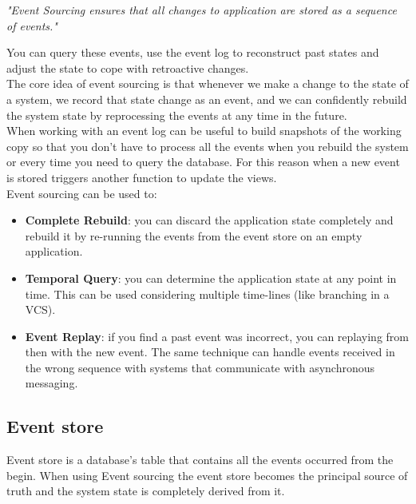\newpage
{}
\begin{center}
	\emph{"Event Sourcing ensures that all changes to application are stored as a sequence of events."} \\
\end{center}

You can query these events, use the event log to reconstruct past states and adjust the state to cope with retroactive changes.\\
The core idea of event sourcing is that whenever we make a change to the state of a system, we record that state change as an event, and we can confidently rebuild the system state by reprocessing the events at any time in the future.\\
When working with an event log can be useful to build snapshots of the working copy so that you don't have to process all the events when you rebuild the system or every time you need to query the database. For this reason when a new event is stored triggers another function to update the views.\\
Event sourcing can be used to:
\begin{itemize}
	\item \textbf{Complete Rebuild}: you can discard the application state completely and rebuild it by re-running the events from the event store on an empty application.
	\item \textbf{Temporal Query}: you can determine the application state at any point in time. This can be used considering multiple time-lines (like branching in a VCS).
	\item \textbf{Event Replay}: if you find a past event was incorrect, you can replaying from then with the new event. The same technique can handle events received in the wrong sequence with systems that communicate with asynchronous messaging.
	
\end{itemize}

\subsection{Event store}
Event store is a database's table that contains all the events occurred from the begin.
When using Event sourcing the event store becomes the principal source of truth and the system state is completely derived from it. 

